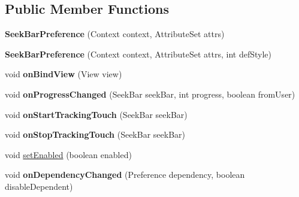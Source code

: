 \subsection*{Public Member Functions}
\begin{DoxyCompactItemize}
\item 
\hypertarget{classcom_1_1qualoutdoor_1_1recorder_1_1settings_1_1SeekBarPreference_a4255dce29ebda830cc20271fff32b871}{{\bfseries Seek\-Bar\-Preference} (Context context, Attribute\-Set attrs)}\label{classcom_1_1qualoutdoor_1_1recorder_1_1settings_1_1SeekBarPreference_a4255dce29ebda830cc20271fff32b871}

\item 
\hypertarget{classcom_1_1qualoutdoor_1_1recorder_1_1settings_1_1SeekBarPreference_a5be65932f198ea4cc6dbea379ec5057f}{{\bfseries Seek\-Bar\-Preference} (Context context, Attribute\-Set attrs, int def\-Style)}\label{classcom_1_1qualoutdoor_1_1recorder_1_1settings_1_1SeekBarPreference_a5be65932f198ea4cc6dbea379ec5057f}

\item 
\hypertarget{classcom_1_1qualoutdoor_1_1recorder_1_1settings_1_1SeekBarPreference_a23f800c5a8718751fa49bd7a102d3b02}{void {\bfseries on\-Bind\-View} (View view)}\label{classcom_1_1qualoutdoor_1_1recorder_1_1settings_1_1SeekBarPreference_a23f800c5a8718751fa49bd7a102d3b02}

\item 
\hypertarget{classcom_1_1qualoutdoor_1_1recorder_1_1settings_1_1SeekBarPreference_a98a0d922e86ad57267c25db5d6880d73}{void {\bfseries on\-Progress\-Changed} (Seek\-Bar seek\-Bar, int progress, boolean from\-User)}\label{classcom_1_1qualoutdoor_1_1recorder_1_1settings_1_1SeekBarPreference_a98a0d922e86ad57267c25db5d6880d73}

\item 
\hypertarget{classcom_1_1qualoutdoor_1_1recorder_1_1settings_1_1SeekBarPreference_ae312a8f9bc4b6e9e64737620006882e3}{void {\bfseries on\-Start\-Tracking\-Touch} (Seek\-Bar seek\-Bar)}\label{classcom_1_1qualoutdoor_1_1recorder_1_1settings_1_1SeekBarPreference_ae312a8f9bc4b6e9e64737620006882e3}

\item 
\hypertarget{classcom_1_1qualoutdoor_1_1recorder_1_1settings_1_1SeekBarPreference_ae8cd7ccb2c012a1396ef03689c5584cf}{void {\bfseries on\-Stop\-Tracking\-Touch} (Seek\-Bar seek\-Bar)}\label{classcom_1_1qualoutdoor_1_1recorder_1_1settings_1_1SeekBarPreference_ae8cd7ccb2c012a1396ef03689c5584cf}

\item 
void \hyperlink{classcom_1_1qualoutdoor_1_1recorder_1_1settings_1_1SeekBarPreference_ac173b08151c88882ace4d6c0963c1d66}{set\-Enabled} (boolean enabled)
\item 
\hypertarget{classcom_1_1qualoutdoor_1_1recorder_1_1settings_1_1SeekBarPreference_a768f7a3ad182a3f89236174dec2ab767}{void {\bfseries on\-Dependency\-Changed} (Preference dependency, boolean disable\-Dependent)}\label{classcom_1_1qualoutdoor_1_1recorder_1_1settings_1_1SeekBarPreference_a768f7a3ad182a3f89236174dec2ab767}

\end{DoxyCompactItemize}
